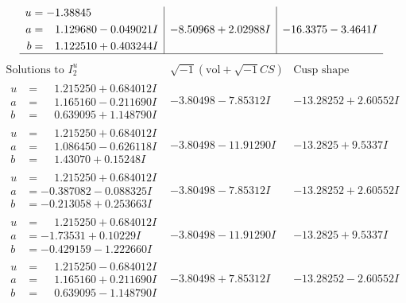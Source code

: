 \documentclass[1p]{elsarticle_modified}
\theoremstyle{definition}
\newcommand{\I}{\sqrt{-1}}
\begin{document}
$$\begin{array}{c|c|c}
\begin{aligned}
u &= -1.38845\phantom{ +0.000000I} \\
a &= \phantom{-}1.129680 - 0.049021 I \\
b &= \phantom{-}1.122510 + 0.403244 I\end{aligned}
 & -8.50968 + 2.02988 I & -16.3375 - 3.4641 I\\
 \hline 
 \end{array}$$\newpage$$\begin{array}{c|c|c}  
\text{Solutions to }I^u_{2}& \I (\text{vol} + \sqrt{-1}CS) & \text{Cusp shape}\\
 \hline 
\begin{aligned}
u &= \phantom{-}1.215250 + 0.684012 I \\
a &= \phantom{-}1.165160 - 0.211690 I \\
b &= \phantom{-}0.639095 + 1.148790 I\end{aligned}
 & -3.80498 - 7.85312 I & -13.28252 + 2.60552 I \\ \hline\begin{aligned}
u &= \phantom{-}1.215250 + 0.684012 I \\
a &= \phantom{-}1.086450 - 0.626118 I \\
b &= \phantom{-}1.43070 + 0.15248 I\end{aligned}
 & -3.80498 - 11.91290 I & -13.2825 + 9.5337 I \\ \hline\begin{aligned}
u &= \phantom{-}1.215250 + 0.684012 I \\
a &= -0.387082 - 0.088325 I \\
b &= -0.213058 + 0.253663 I\end{aligned}
 & -3.80498 - 7.85312 I & -13.28252 + 2.60552 I \\ \hline\begin{aligned}
u &= \phantom{-}1.215250 + 0.684012 I \\
a &= -1.73531 + 0.10229 I \\
b &= -0.429159 - 1.222660 I\end{aligned}
 & -3.80498 - 11.91290 I & -13.2825 + 9.5337 I \\ \hline\begin{aligned}
u &= \phantom{-}1.215250 - 0.684012 I \\
a &= \phantom{-}1.165160 + 0.211690 I \\
b &= \phantom{-}0.639095 - 1.148790 I\end{aligned}
 & -3.80498 + 7.85312 I & -13.28252 - 2.60552 I \\ \hline\begin{aligned}

\end{aligned}
\end{array}$$
\end{document}
